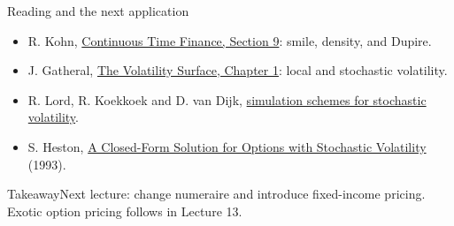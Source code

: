 \documentclass[handout,10pt,t,aspectratio=169]{beamer}
\newenvironment{keybox}{\begin{exampleblock}{Takeaway}}{\end{exampleblock}}
\begin{document}
\begin{frame}{Reading and the next application}

    \small
    \begin{itemize}
    \item R. Kohn, \href{https://math.nyu.edu/faculty/kohn/cont-time-finance/section9.pdf}{Continuous Time Finance, Section 9}: smile, density, and Dupire.
    \item J. Gatheral, \href{https://catalogimages.wiley.com/images/db/pdf/9780471792512.excerpt.pdf}{The Volatility Surface, Chapter 1}: local and stochastic volatility.
    \item R. Lord, R. Koekkoek and D. van Dijk,
    \href{https://repub.eur.nl/pub/7738}{simulation schemes for stochastic volatility}.
    \item S. Heston, \href{https://finance.martinsewell.com/stylized-facts/volatility/Heston1993.pdf}{A Closed-Form Solution for Options with Stochastic Volatility} (1993).
    \end{itemize}
    \begin{keybox}Next lecture: change numeraire and introduce fixed-income pricing.
    Exotic option pricing follows in Lecture 13.\end{keybox}
\end{frame}
\end{document}
